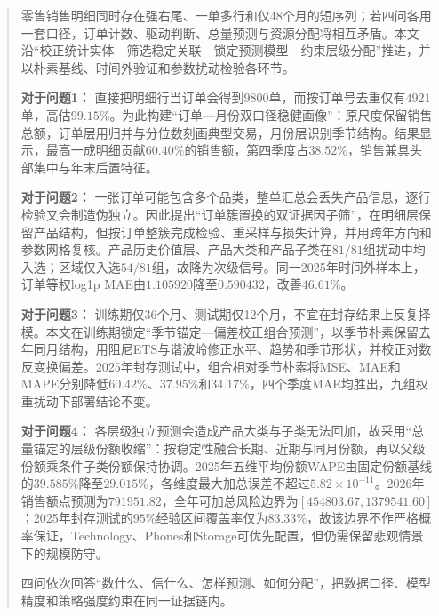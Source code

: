 \begin{abstract}

零售销售明细同时存在强右尾、一单多行和仅48个月的短序列；若四问各用一套口径，订单计数、驱动判断、总量预测与资源分配将相互矛盾。本文沿“校正统计实体—筛选稳定关联—锁定预测模型—约束层级分配”推进，并以朴素基线、时间外验证和参数扰动检验各环节。

\textbf{对于问题1：}%
直接把明细行当订单会得到$9800$单，而按订单号去重仅有$4921$单，高估$99.15\%$。为此构建“订单—月份双口径稳健画像”：原尺度保留销售总额，订单层用归并与分位数刻画典型交易，月份层识别季节结构。结果显示，最高一成明细贡献$60.40\%$的销售额，第四季度占$38.52\%$，销售兼具头部集中与年末后置特征。%

\textbf{对于问题2：}%
一张订单可能包含多个品类，整单汇总会丢失产品信息，逐行检验又会制造伪独立。因此提出“订单簇置换的双证据因子筛”，在明细层保留产品结构，但按订单整簇完成检验、重采样与损失计算，并用跨年方向和参数网格复核。产品历史价值层、产品大类和产品子类在$81/81$组扰动中均入选；区域仅入选$54/81$组，故降为次级信号。同一2025年时间外样本上，订单等权log1p MAE由$1.105920$降至$0.590432$，改善$46.61\%$。%

\textbf{对于问题3：}%
训练期仅36个月、测试期仅12个月，不宜在封存结果上反复择模。本文在训练期锁定“季节锚定—偏差校正组合预测”，以季节朴素保留去年同月结构，用阻尼ETS与谐波岭修正水平、趋势和季节形状，并校正对数反变换偏差。2025年封存测试中，组合相对季节朴素将MSE、MAE和MAPE分别降低$60.42\%$、$37.95\%$和$34.17\%$，四个季度MAE均胜出，九组权重扰动下部署结论不变。%

\textbf{对于问题4：}%
各层级独立预测会造成产品大类与子类无法回加，故采用“总量锚定的层级份额收缩”：按稳定性融合长期、近期与同月份额，再以父级份额乘条件子类份额保持协调。2025年五维平均份额WAPE由固定份额基线的$39.585\%$降至$29.015\%$，各维度最大加总误差不超过$5.82\times10^{-11}$。2026年销售额点预测为$791951.82$，全年可加总风险边界为$[454803.67,1379541.60]$；2025年封存测试的$95\%$经验区间覆盖率仅为$83.33\%$，故该边界不作严格概率保证，Technology、Phones和Storage可优先配置，但仍需保留悲观情景下的规模防守。%

四问依次回答“数什么、信什么、怎样预测、如何分配”，把数据口径、模型精度和策略强度约束在同一证据链内。

\label{abstract:end}

\end{abstract}
